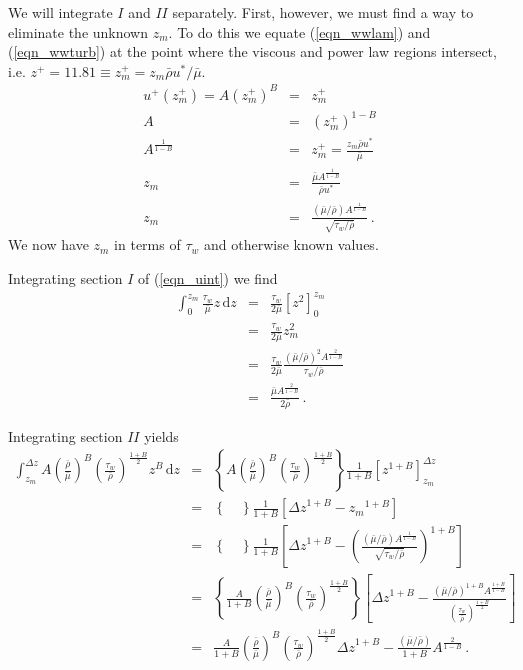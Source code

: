 We will integrate $I$ and $II$ separately.  First, however, we must find a way to eliminate the unknown $z_m$.  To do this we equate (\ref{eqn_wwlam}) and (\ref{eqn_wwturb}) at the point where the viscous and power law regions intersect, i.e. $z^+ = 11.81 \equiv z_m^+ = z_m \bar{\rho}u^*/\bar{\mu}$.
\begin{eqnarray}
\label{eqn_derivezm}
u^+(z_m^+) = A(z_m^+)^B &=& z_m^+ \nonumber\\
A &=& (z_m^+)^{1-B} \nonumber\\
A^{\frac{1}{1-B}} &=& z_m^+ = \frac{z_m\bar{\rho}u^*}{\bar{\mu}} \nonumber\\
z_m &=& \frac{\bar{\mu}A^{\frac{1}{1-B}}}{\bar{\rho}u^*} \nonumber\\
z_m &=& \frac{(\bar{\mu}/\bar{\rho})A^{\frac{1}{1-B}}}{\sqrt{\tau_w/\bar{\rho}}} \,\mbox{.}
\end{eqnarray}
We now have $z_m$ in terms of $\tau_w$ and otherwise known values.

Integrating section $I$ of (\ref{eqn_uint}) we find
\begin{eqnarray}
\label{eqn_intI}
\int_0^{z_m} \frac{\tau_w}{\bar{\mu}} z\,\mbox{d}z &=& \frac{\tau_w}{2\bar{\mu}} \left[ z^2 \right]_0^{z_m} \nonumber\\
&=& \frac{\tau_w}{2\bar{\mu}} z_m^2 \nonumber\\
&=& \frac{\tau_w}{2\bar{\mu}} \frac{(\bar{\mu}/\bar{\rho})^2A^{\frac{2}{1-B}}}{\tau_w/\bar{\rho}} \nonumber\\
&=& \frac{\bar{\mu} A^{\frac{2}{1-B}}}{2\bar{\rho}} \,\mbox{.}
\end{eqnarray}

Integrating section $II$ yields
\begin{eqnarray}
\label{eqn_intII}
\int_{z_m}^{\Delta z} A\left(\frac{\bar{\rho}}{\bar{\mu}}\right)^B \left(\frac{\tau_w}{\bar{\rho}}\right)^{\frac{1+B}{2}} z^B\,\mbox{d}z &=& \left\{A\left(\frac{\bar{\rho}}{\bar{\mu}}\right)^B \left(\frac{\tau_w}{\bar{\rho}}\right)^{\frac{1+B}{2}}\right\} \frac{1}{1+B} \left[z^{1+B}\right]_{z_m}^{\Delta z} \nonumber\\
&=& \left\{ \quad \right\} \frac{1}{1+B} \left[{\Delta z}^{1+B} - {z_m}^{1+B}\right] \nonumber\\
&=& \left\{ \quad \right\} \frac{1}{1+B} \left[{\Delta z}^{1+B} - \left(\frac{(\bar{\mu}/\bar{\rho})A^{\frac{1}{1-B}}}{\sqrt{\tau_w/\bar{\rho}}}\right)^{1+B}\right] \nonumber\\
&=& \left\{ \frac{A}{1+B} \left(\frac{\bar{\rho}}{\bar{\mu}}\right)^B \left(\frac{\tau_w}{\bar{\rho}}\right)^{\frac{1+B}{2}} \right\} \left[{\Delta z}^{1+B} - \frac{(\bar{\mu}/\bar{\rho})^{1+B} A^{\frac{1+B}{1-B}}}{\left(\frac{\tau_w}{\bar{\rho}}\right)^{\frac{1+B}{2}}}\right] \nonumber\\
&=& \frac{A}{1+B} \left(\frac{\bar{\rho}}{\bar{\mu}}\right)^B \left(\frac{\tau_w}{\bar{\rho}}\right)^{\frac{1+B}{2}} {\Delta z}^{1+B} - \frac{(\bar{\mu}/\bar{\rho})}{1+B} A^{\frac{2}{1-B}} \,\mbox{.}
\end{eqnarray}

